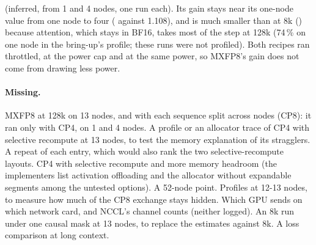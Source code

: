(inferred, from 1 and 4 nodes, one run each). Its gain stays near its one-node value from one node to four (\TriQwCpMxSpeedup{} against 1.108), and is much smaller than at 8k (\TriQwFpFourSpMxBf) because attention, which stays in BF16, takes most of the step at 128k (74\,\% on one node in the bring-up's profile; these runs were not profiled). Both recipes ran throttled, at the power cap and at the same power, so MXFP8's gain does not come from drawing less power.

\paragraph{Missing.} MXFP8 at 128k on 13 nodes, and with each sequence split across nodes (CP8): it ran only with CP4, on 1 and 4 nodes. A profile or an allocator trace of CP4 with selective recompute at 13 nodes, to test the memory explanation of its stragglers. A repeat of each entry, which would also rank the two selective-recompute layouts. CP4 with selective recompute and more memory headroom (the implementers list activation offloading and the allocator without expandable segments among the untested options). A 52-node point. Profiles at 12-13 nodes, to measure how much of the CP8 exchange stays hidden. Which GPU sends on which network card, and NCCL's channel counts (neither logged). An 8k run under one causal mask at 13 nodes, to replace the estimates against 8k. A loss comparison at long context.

